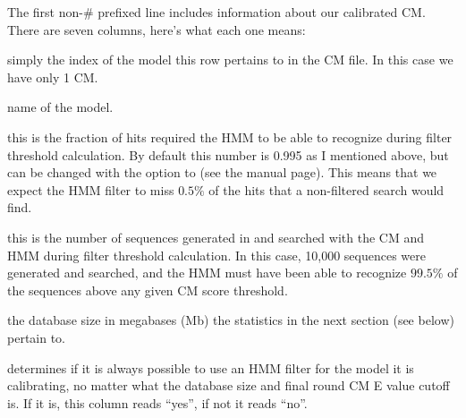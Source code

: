 The first non-\# prefixed line includes information about our
calibrated CM. There are seven columns, here's what each one
means:

\begin{wideitem}

\item[\emprog{idx}] simply the index of the model this row pertains to in
  the CM file. In this case we have only 1 CM.

\item[\emprog{name}] name of the model.

\item[\emprog{F}] this is the fraction of hits 
  required the HMM to be able to recognize during filter threshold
  calculation. By default this number is 0.995 as I mentioned above,
  but can be changed with the  option to 
  (see the manual page). This means that we expect the HMM filter to miss
  $0.5\%$ of the hits that a non-filtered search would find.

\item[\emprog{nseq}] this is the number of sequences generated in 
  and searched with the CM and HMM during filter threshold
  calculation. In this case, 10,000 sequences were generated and
  searched, and the HMM must have been able to recognize $99.5\%$ of the
  sequences above any given CM score threshold. 

\item[\emprog{db (Mb)}] the database size in megabases (Mb) the
  statistics in the next section (see below) pertain to.

\item[\emprog{always?}]  determines if it is always
  possible to use an HMM filter for the model it is calibrating, no
  matter what the database size and final round CM E value cutoff
  is. If it is, this column reads ``yes'', if not it reads ``no''.

\end{wideitem}

